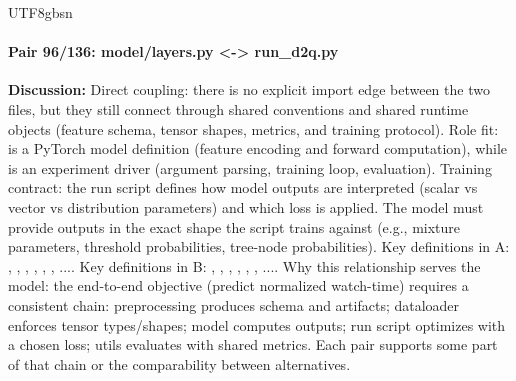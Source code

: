 \documentclass[11pt]{article}
\begin{document}
\begin{CJK*}{UTF8}{gbsn}
\paragraph{Pair 96/136: model/layers.py <-> run\_d2q.py}
\textbf{Discussion:} Direct coupling: there is no explicit import edge between the two files, but they still connect through shared conventions and shared runtime objects (feature schema, tensor shapes, metrics, and training protocol). Role fit: \texttt{} is a PyTorch model definition (feature encoding and forward computation), while \texttt{} is an experiment driver (argument parsing, training loop, evaluation). Training contract: the run script defines how model outputs are interpreted (scalar vs vector vs distribution parameters) and which loss is applied. The model must provide outputs in the exact shape the script trains against (e.g., mixture parameters, threshold probabilities, tree-node probabilities). Key definitions in A: \texttt{}, \texttt{}, \texttt{}, \texttt{}, \texttt{}, \texttt{}, .... Key definitions in B: \texttt{}, \texttt{}, \texttt{}, \texttt{}, \texttt{}, \texttt{}, .... Why this relationship serves the model: the end-to-end objective (predict normalized watch-time) requires a consistent chain: preprocessing produces schema and artifacts; dataloader enforces tensor types/shapes; model computes outputs; run script optimizes with a chosen loss; utils evaluates with shared metrics. Each pair supports some part of that chain or the comparability between alternatives.


\end{CJK*}
\end{document}
